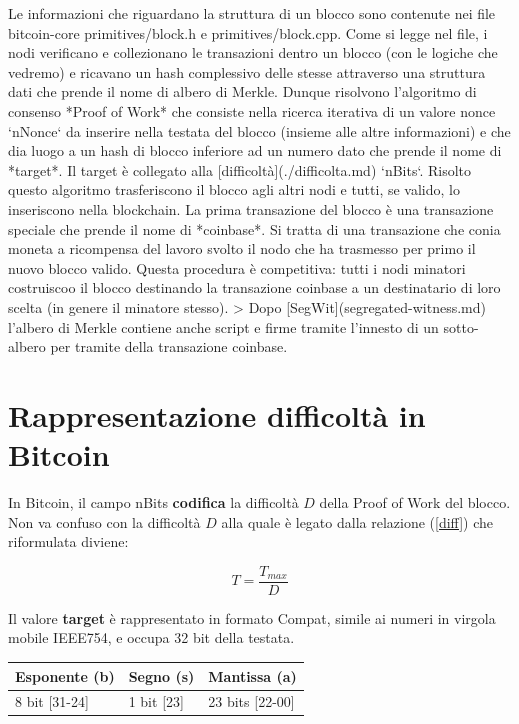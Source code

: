 \documentclass{article}
\begin{document}
Le informazioni che riguardano la struttura di un blocco sono contenute nei file bitcoin-core primitives/block.h e primitives/block.cpp.
Come si legge nel file, i nodi verificano e collezionano le transazioni dentro un blocco (con le logiche che vedremo) e ricavano un hash complessivo delle stesse attraverso una struttura dati che prende il nome di albero di Merkle.
Dunque risolvono l'algoritmo di consenso *Proof of Work* che consiste nella ricerca iterativa di un valore nonce `nNonce` da inserire nella testata del blocco (insieme alle altre informazioni) e che dia luogo a un hash di blocco inferiore ad un numero dato che prende il nome di *target*. Il target è collegato alla [difficoltà](./difficolta.md) `nBits`.
Risolto questo algoritmo trasferiscono il blocco agli altri nodi e tutti, se valido, lo inseriscono nella blockchain. La prima transazione del blocco è una transazione speciale che prende il nome di *coinbase*. Si tratta di una transazione che conia moneta a ricompensa del lavoro svolto il nodo che ha trasmesso per primo il nuovo blocco valido. Questa procedura è competitiva: tutti i nodi minatori costruiscoo il blocco destinando la transazione coinbase a un destinatario di loro scelta (in genere il minatore stesso).
> Dopo [SegWit](segregated-witness.md) l'albero di Merkle contiene anche script e firme tramite l'innesto di un sotto-albero per tramite della transazione coinbase.

\section{Rappresentazione difficoltà in Bitcoin}

In Bitcoin, il campo nBits \textbf{codifica} la difficoltà $D$ della Proof of Work del blocco.
Non va confuso con la difficoltà $D$ alla quale è legato dalla relazione (\ref{diff}) che riformulata diviene:

\begin{equation}
    T = \frac{T_{max}}{D} \label{targetFromDiff}
\end{equation}

Il valore \textbf{target} è rappresentato in formato Compat, simile ai numeri in virgola mobile IEEE754, e occupa 32 bit della testata.

\begin{table}[ht]
    \centering
    \begin{tabular}{|l|l|l|}
        \hline
        \multicolumn{1}{|c|}{Esponente (b)} & \multicolumn{1}{c|}{Segno (s)} & \multicolumn{1}{c|}{Mantissa (a)} \\ \hline
        8 bit {[}31-24{]}               & 1 bit {[}23{]}             & 23 bits {[}22-00{]}           \\ \hline
    \end{tabular}
\end{table}
\end{document}
